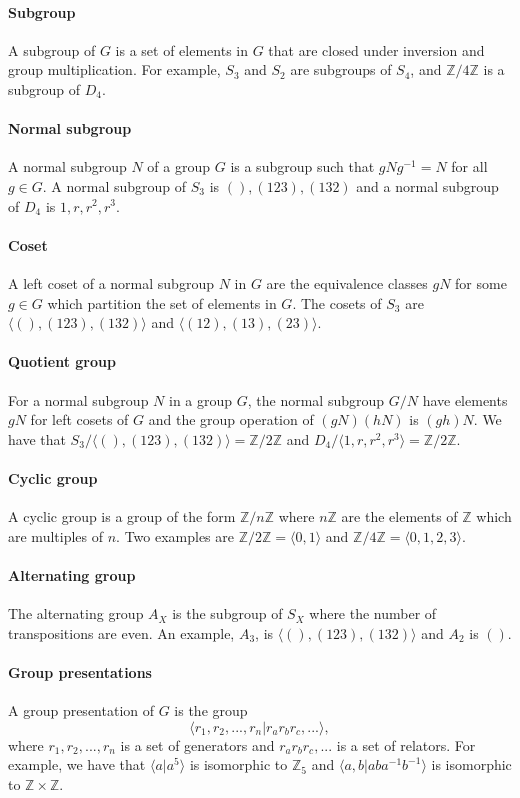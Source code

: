 \documentclass[]{article}
\begin{document}
\paragraph{Subgroup} A subgroup of $G$ is a set of elements in $G$ that are closed under inversion and group multiplication. For example, $S_3$ and $S_2$ are subgroups of $S_4$, and $\mathbb{Z}/4 \mathbb{Z}$ is a subgroup of $D_4$.
\paragraph{Normal subgroup} A normal subgroup $N$ of a group $G$ is a subgroup such that $g N g^{-1} = N$ for all $g \in G$. A normal subgroup of $S_3$ is $(), (123), (132)$ and a normal subgroup of $D_4$ is $1, r, r^2, r^3$. 
\paragraph{Coset} A left coset of a normal subgroup $N$ in $G$ are the equivalence classes $gN$ for some $g \in G$ which partition the set of elements in $G$. The cosets of $S_3$ are $\langle (), (123), (132) \rangle$ and $\langle (12), (13), (23) \rangle$.
\paragraph{Quotient group} For a normal subgroup $N$ in a group $G$, the normal subgroup $G/N$ have elements $gN$ for left cosets of $G$ and the group operation of $(gN)(hN)$ is $(gh)N$. We have that $S_3/\langle (), (123), (132) \rangle = \mathbb{Z}/2 \mathbb{Z}$ and $D_4/ \langle 1, r, r^2, r^3 \rangle = \mathbb{Z}/2 \mathbb{Z}$.
\paragraph{Cyclic group } A cyclic group is a group of the form $\mathbb{Z}/n\mathbb{Z}$ where $n\mathbb{Z}$ are the elements of $\mathbb{Z}$ which are multiples of $n$. Two examples are $\mathbb{Z}/2 \mathbb{Z} = \langle 0, 1 \rangle $ and $\mathbb{Z}/4 \mathbb{Z} = \langle 0, 1, 2, 3 \rangle$. 
\paragraph{Alternating group} The alternating group $A_X$ is the subgroup of $S_X$ where the number of transpositions are even. An example, $A_3$, is $\langle (), (123), (132) \rangle$ and $A_2$ is $()$. 
\paragraph{Group presentations} A group presentation of $G$ is the group 
\begin{equation}
	\langle r_1, r_2, ..., r_n | r_a r_b r_c, ...\rangle,
\end{equation}
where $r_1, r_2, ..., r_n$ is a set of generators and $r_a r_b r_c, ...$ is a set of relators. For example, we have that $\langle a | a^5 \rangle$ is isomorphic to $\mathbb{Z}_5$ and $ \langle a, b | aba^{-1}b^{-1} \rangle$ is isomorphic to $\mathbb{Z} \times \mathbb{Z}$. 
\end{document}
